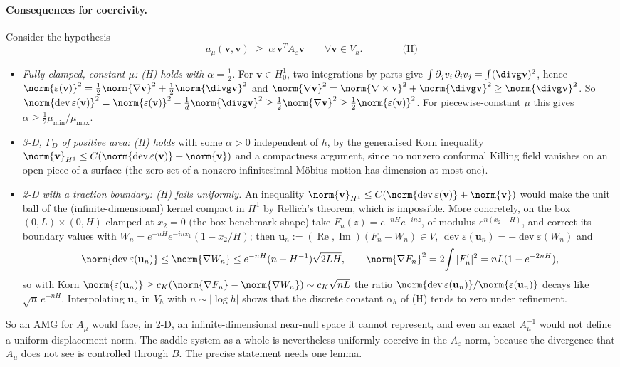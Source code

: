 \documentclass[11pt]{article}
\numberwithin{equation}{section}
\theoremstyle{remark}
\newcommand{\eps}{\varepsilon}
\newcommand{\dev}{\operatorname{dev}}
\newcommand{\vu}{\mathbf{u}}
\newcommand{\vv}{\mathbf{v}}
\newcommand{\Ae}{A_{\eps}}
\newcommand{\Amu}{A_{\mu}}
\newcommand{\Vh}{V_h}
\begin{document}
\paragraph{Consequences for coercivity.} Consider the hypothesis
\[
  a_\mu(\vv,\vv)\;\ge\;\alpha\,\vv^T\Ae\vv \qquad \forall\vv\in\Vh .
  \qquad\qquad\text{(H)}
\]
\begin{itemize}
\item \emph{Fully clamped, constant $\mu$: (H) holds with $\alpha =
  \frac12$.} For $\vv\in H^1_0$, two integrations by parts give
  $\int\partial_jv_i\,\partial_iv_j = \int(\divg\vv)^2$, hence
  $\norm{\eps(\vv)}^2 = \frac12\norm{\nabla\vv}^2 +
  \frac12\norm{\divg\vv}^2$ and $\norm{\nabla\vv}^2 =
  \norm{\nabla\times\vv}^2 + \norm{\divg\vv}^2\ge\norm{\divg\vv}^2$. So
  $\norm{\dev\eps(\vv)}^2 = \norm{\eps(\vv)}^2 - \frac1d\norm{\divg\vv}^2
  \ge\frac12\norm{\nabla\vv}^2\ge\frac12\norm{\eps(\vv)}^2$. For
  piecewise-constant $\mu$ this gives $\alpha\ge\frac12\mu_{\min}/\mu_{\max}$.
\item \emph{3-D, $\Gamma_D$ of positive area: (H) holds} with some
  $\alpha>0$ independent of $h$, by the generalised Korn inequality
  $\norm{\vv}_{H^1}\le C(\norm{\dev\eps(\vv)} + \norm{\vv})$ \cite{Dain2006}
  and a compactness argument, since no nonzero conformal Killing field
  vanishes on an open piece of a surface (the zero set of a nonzero
  infinitesimal Möbius motion has dimension at most one).
\item \emph{2-D with a traction boundary: (H) fails uniformly.} An
  inequality $\norm{\vv}_{H^1}\le C(\norm{\dev\eps(\vv)} + \norm{\vv})$
  would make the unit ball of the (infinite-dimensional) kernel compact
  in $H^1$ by Rellich's theorem, which is impossible. More concretely, on
  the box $(0,L)\times(0,H)$ clamped at $x_2 = 0$ (the box-benchmark
  shape) take $F_n(z) = e^{-nH}e^{-inz}$, of modulus $e^{n(x_2 - H)}$, and
  correct its boundary values with $W_n = e^{-nH}e^{-inx_1}(1 - x_2/H)$;
  then $\vu_n := (\operatorname{Re},\operatorname{Im})(F_n - W_n)\in V$,
  $\dev\eps(\vu_n) = -\dev\eps(W_n)$ and
  \[
    \norm{\dev\eps(\vu_n)}\le\norm{\nabla W_n}
      \le e^{-nH}(n + H^{-1})\sqrt{2LH},
    \qquad
    \norm{\nabla F_n}^2 = 2\!\int|F_n'|^2 = nL(1 - e^{-2nH}),
  \]
  so with Korn $\norm{\eps(\vu_n)}\ge c_K(\norm{\nabla F_n} -
  \norm{\nabla W_n})\sim c_K\sqrt{nL}$ the ratio
  $\norm{\dev\eps(\vu_n)}/\norm{\eps(\vu_n)}$ decays like $\sqrt n\,e^{-nH}$.
  Interpolating $\vu_n$ in $\Vh$ with $n\sim|\log h|$ shows that the
  discrete constant $\alpha_h$ of (H) tends to zero under refinement.
\end{itemize}
So an AMG for $\Amu$ would face, in 2-D, an infinite-dimensional
near-null space it cannot represent, and even an exact $\Amu^{-1}$ would
not define a uniform displacement norm. The saddle system as a whole is
nevertheless uniformly coercive in the $\Ae$-norm, because the
divergence that $\Amu$ does not see is controlled through $B$. The
precise statement needs one lemma.
\end{document}
